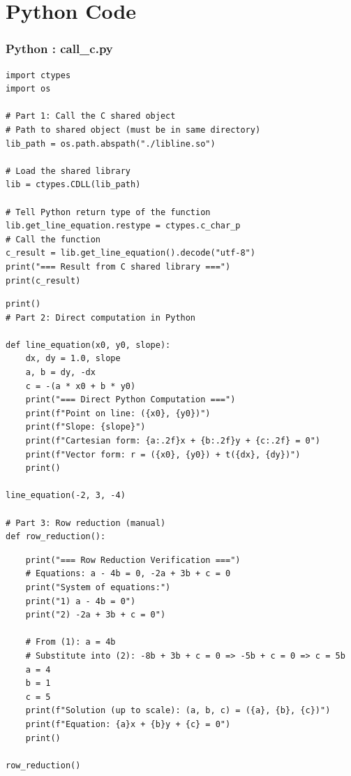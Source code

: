 \documentclass{beamer}
\theoremstyle{remark}
\numberwithin{equation}{section}
\begin{document}
\section{Python Code}
\begin{frame}[fragile]
\frametitle{Python : call\_c.py}
\begin{lstlisting}
import ctypes
import os

# Part 1: Call the C shared object
# Path to shared object (must be in same directory)
lib_path = os.path.abspath("./libline.so")

# Load the shared library
lib = ctypes.CDLL(lib_path)

# Tell Python return type of the function
lib.get_line_equation.restype = ctypes.c_char_p
# Call the function
c_result = lib.get_line_equation().decode("utf-8")
print("=== Result from C shared library ===")
print(c_result)
\end{lstlisting}
\end{frame}
\begin{frame}[fragile]
\begin{lstlisting}
print()
# Part 2: Direct computation in Python

def line_equation(x0, y0, slope):
    dx, dy = 1.0, slope
    a, b = dy, -dx
    c = -(a * x0 + b * y0)
    print("=== Direct Python Computation ===")
    print(f"Point on line: ({x0}, {y0})")
    print(f"Slope: {slope}")
    print(f"Cartesian form: {a:.2f}x + {b:.2f}y + {c:.2f} = 0")
    print(f"Vector form: r = ({x0}, {y0}) + t({dx}, {dy})")
    print()

line_equation(-2, 3, -4)

# Part 3: Row reduction (manual)
def row_reduction():
\end{lstlisting}
\end{frame}
\begin{frame}[fragile]
\begin{lstlisting}
    print("=== Row Reduction Verification ===")
    # Equations: a - 4b = 0, -2a + 3b + c = 0
    print("System of equations:")
    print("1) a - 4b = 0")
    print("2) -2a + 3b + c = 0")

    # From (1): a = 4b
    # Substitute into (2): -8b + 3b + c = 0 => -5b + c = 0 => c = 5b
    a = 4
    b = 1
    c = 5
    print(f"Solution (up to scale): (a, b, c) = ({a}, {b}, {c})")
    print(f"Equation: {a}x + {b}y + {c} = 0")
    print()

row_reduction()

\end{lstlisting}
\end{frame}
\end{document}

